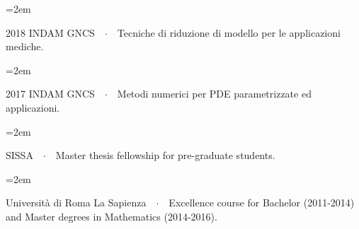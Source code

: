 \documentclass[
  usegeometry%
]{scrartcl}
\newcommand{\Description}[1]{\hangindent=2em\hangafter=0\noindent\raggedright\footnotesize{#1}\par\normalsize\vspace{1em}} %
\begin{document}
\begin{cv}{}
\vspace{-0.5em} %

\Description{{\color{violet}2018 INDAM GNCS}\ \ $\cdotp$\ \  Tecniche di riduzione di modello per le applicazioni mediche.}

\vspace{-0.5em} %
%
\Description{{\color{violet}2017 INDAM GNCS}\ \ $\cdotp$\ \  Metodi numerici per PDE parametrizzate ed applicazioni.}

\vspace{-0.5em} %

\Description{{\color{violet}SISSA}\ \ $\cdotp$\ \ Master thesis fellowship for pre-graduate students.}

\vspace{-0.5em} %

\Description{{\color{violet}Università di Roma La Sapienza}\ \ $\cdotp$\ \ Excellence course for Bachelor (2011-2014) and Master degrees in Mathematics (2014-2016).}






\end{cv}
\end{document}
